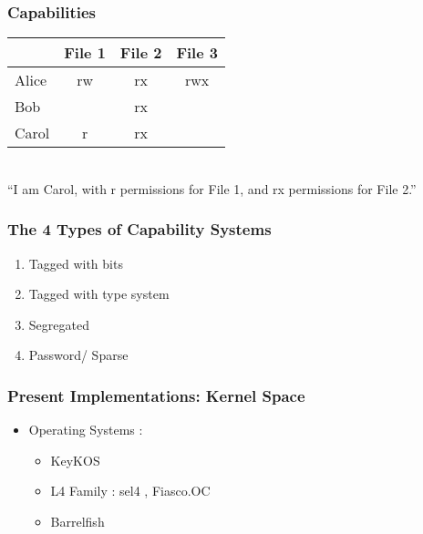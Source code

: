 \documentclass[xcolor=table]{beamer}
\begin{document}
\begin{frame}
  \frametitle{Capabilities}
  \begin{center}
    \begin{tabular}{|l||c|c|c|}
      \hline
      &File 1&File 2&File 3\\
      \hline
      \hline
      Alice&rw&rx&rwx\\
      \hline
      Bob&&rx&\\
      \hline
      \cellcolor{green}Carol&\cellcolor{green}r&\cellcolor{green}rx&\cellcolor{green}\\
      \hline
    \end{tabular}\\
    \vspace{10pt}
    ``I am Carol, with r permissions for File 1, and rx permissions for File 2.''
  \end{center}
\end{frame}

\begin{frame}
  \frametitle{The 4 Types of Capability Systems}
  
\begin{enumerate}
    \item{Tagged with bits}
    \item{Tagged with type system}
    \item{Segregated}
    \item{Password/ Sparse}
\end{enumerate}
 \end{frame}

\begin{frame}
    \frametitle{Present Implementations: Kernel Space}
     \begin{itemize}
         \item Operating Systems :
         \begin{itemize}
             \item KeyKOS
             \item L4 Family : sel4 , Fiasco.OC
             \item Barrelfish
         \end{itemize}
     \end{itemize}
\end{frame}
\end{document}
